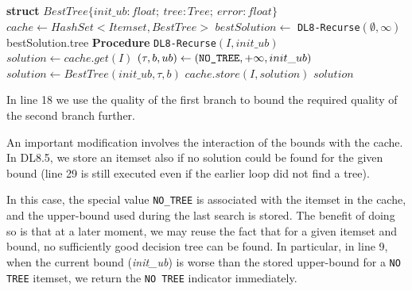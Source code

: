\newcommand{\trmtt}[1]{\textrm{\texttt{#1}}}
\begin{algorithm}
	\DontPrintSemicolon
	\caption{$DL8.5(maxdepth, minsup)$}
	\label{algo:2}
	\label{algo:1}
	\textbf{struct} $BestTree\{init\_ub : float;\ tree: Tree;\ error : float\}$\;
	$cache \gets HashSet < Itemset, BestTree >$\;
	$bestSolution \gets$ \verb|DL8-Recurse|$(\emptyset, \infty)$\;
	\Return bestSolution.tree\;
	\textbf{Procedure} \texttt{DL8-Recurse}$(I, init\_ub)$\;
	$solution \gets cache.get(I)$\;
	$(\tau, b, ub) \gets (\verb|NO_TREE|, +\infty, init\_ub)$\;
	$solution \gets BestTree(init\_ub, \tau, b)$\;
	$cache.store(I, solution)$\;
	\Return $solution$\;
\end{algorithm}


In line 18 we use the quality of the first branch to bound the required quality of the second branch further.

An important modification involves the interaction of the bounds with the cache. In DL8.5, we store an itemset also if no solution could be found for the given bound (line 29 is still executed even if the earlier loop did not find a tree).

In this case, the special value \verb|NO_TREE| is associated with the itemset in the cache, and the upper-bound used during the last search is stored. The benefit of doing so is that at a later moment, we may reuse the fact that for a given itemset and bound, no sufficiently good decision tree can be found. In particular, in line 9, when the current bound (\emph{init\_ub}) is worse than the stored upper-bound for a \verb|NO TREE| itemset, we return the \verb|NO TREE| indicator immediately.

